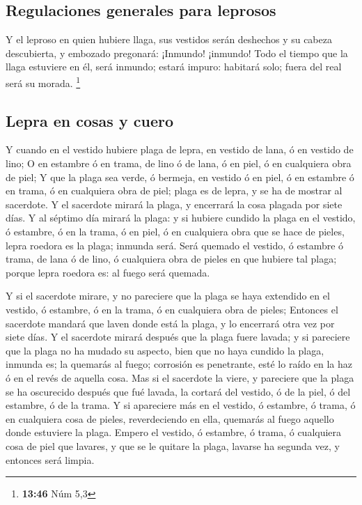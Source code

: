 \hypertarget{regulaciones-generales-para-leprosos}{%
\subsection{Regulaciones generales para
leprosos}\label{regulaciones-generales-para-leprosos}}

 Y el leproso en quien hubiere llaga, sus vestidos serán
deshechos y su cabeza descubierta, y embozado pregonará: ¡Inmundo!
¡inmundo!  Todo el tiempo que la llaga estuviere en él,
será inmundo; estará impuro: habitará solo; fuera del real será su
morada. \footnote{\textbf{13:46} Núm 5,3}

\hypertarget{lepra-en-cosas-y-cuero}{%
\subsection{Lepra en cosas y cuero}\label{lepra-en-cosas-y-cuero}}

 Y cuando en el vestido hubiere plaga de lepra, en
vestido de lana, ó en vestido de lino;  O en estambre ó
en trama, de lino ó de lana, ó en piel, ó en cualquiera obra de piel;
 Y que la plaga sea verde, ó bermeja, en vestido ó en
piel, ó en estambre ó en trama, ó en cualquiera obra de piel; plaga es
de lepra, y se ha de mostrar al sacerdote.  Y el
sacerdote mirará la plaga, y encerrará la cosa plagada por siete días.
 Y al séptimo día mirará la plaga: y si hubiere cundido
la plaga en el vestido, ó estambre, ó en la trama, ó en piel, ó en
cualquiera obra que se hace de pieles, lepra roedora es la plaga;
inmunda será.  Será quemado el vestido, ó estambre ó
trama, de lana ó de lino, ó cualquiera obra de pieles en que hubiere tal
plaga; porque lepra roedora es: al fuego será quemada.

 Y si el sacerdote mirare, y no pareciere que la plaga se
haya extendido en el vestido, ó estambre, ó en la trama, ó en cualquiera
obra de pieles;  Entonces el sacerdote mandará que laven
donde está la plaga, y lo encerrará otra vez por siete días.
 Y el sacerdote mirará después que la plaga fuere lavada;
y si pareciere que la plaga no ha mudado su aspecto, bien que no haya
cundido la plaga, inmunda es; la quemarás al fuego; corrosión es
penetrante, esté lo raído en la haz ó en el revés de aquella cosa.
 Mas si el sacerdote la viere, y pareciere que la plaga
se ha oscurecido después que fué lavada, la cortará del vestido, ó de la
piel, ó del estambre, ó de la trama.  Y si apareciere más
en el vestido, ó estambre, ó trama, ó en cualquiera cosa de pieles,
reverdeciendo en ella, quemarás al fuego aquello donde estuviere la
plaga.  Empero el vestido, ó estambre, ó trama, ó
cualquiera cosa de piel que lavares, y que se le quitare la plaga,
lavarse ha segunda vez, y entonces será limpia.

